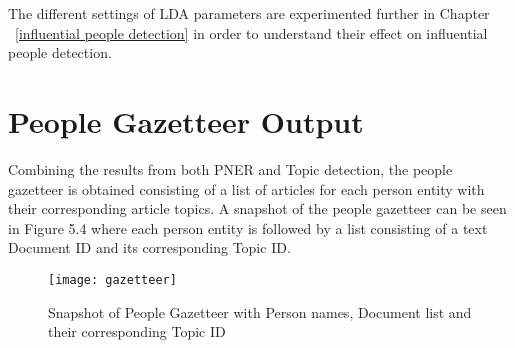 The different settings of LDA parameters are experimented further in Chapter ~\ref{influential people detection} in order to understand their effect on influential people detection.
\section{People Gazetteer Output }
\label{gaz:result}

Combining the results from both PNER and Topic detection, the people gazetteer is obtained consisting of a list of articles for each person entity with their corresponding article topics.
A snapshot of the people gazetteer can be seen in Figure 5.4 where each person entity is followed by a list consisting of a text Document ID and its corresponding Topic ID. 
\begin{figure}[!h]
\texttt{[image: gazetteer]}
\caption{Snapshot of People Gazetteer with Person names, Document list and their corresponding Topic ID}
\end{figure} 


